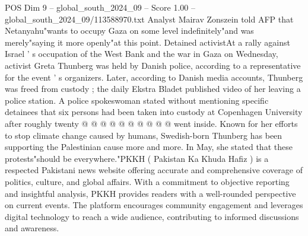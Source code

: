\begin{textsample}{POS Dim 9 – global\_south\_2024\_09 – Score 1.00 – global\_south\_2024\_09/113588970.txt}
Analyst Mairav Zonszein told AFP that Netanyahu"wants to occupy Gaza on some level indefinitely"and was merely"saying it more openly"at this point.
Detained activistAt a rally against Israel ' s occupation of the West Bank and the war in Gaza on Wednesday, activist Greta Thunberg was held by Danish police, according to a representative for the event ' s organizers.
Later, according to Danish media accounts, Thunberg was freed from custody ; the daily Ekstra Bladet published video of her leaving a police station.
A police spokeswoman stated without mentioning specific detainees that six persons had been taken into custody at Copenhagen University after roughly twenty @ @ @ @ @ @ @ @ @ @ went inside.
Known for her efforts to stop climate change caused by humans, Swedish-born Thunberg has been supporting the Palestinian cause more and more.
In May, she stated that these protests"should be everywhere."PKKH ( Pakistan Ka Khuda Hafiz ) is a respected Pakistani news website offering accurate and comprehensive coverage of politics, culture, and global affairs.
With a commitment to objective reporting and insightful analysis, PKKH provides readers with a well-rounded perspective on current events.
The platform encourages community engagement and leverages digital technology to reach a wide audience, contributing to informed discussions and awareness.

\end{textsample}
